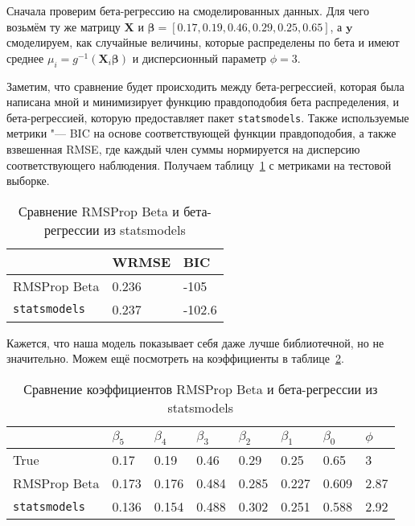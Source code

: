 \documentclass[12pt]{article}
\begin{document}
 	Сначала проверим бета-регрессию на смоделированных данных. Для чего возьмём ту же матрицу $\mathbf{X}$ и $\boldsymbol{\beta} = [0.17, 0.19, 0.46, 0.29, 0.25, 0.65]$, а $\mathbf{y}$ смоделируем, как случайные величины, которые распределены по бета и имеют среднее $\mu _i = g ^{-1} (\mathbf{X}_ i \boldsymbol{\beta})$ и дисперсионный параметр $\phi = 3$.
 	
 	Заметим, что сравнение будет происходить между бета-регрессией, которая была написана мной и минимизирует функцию правдоподобия бета распределения, и бета-регрессией, которую предоставляет пакет \verb|statsmodels|. Также используемые метрики "--- BIC на основе соответствующей функции правдоподобия, а также взвешенная RMSE, где каждый член суммы нормируется на дисперсию соответствующего наблюдения. Получаем таблицу~\ref{table2} с метриками на тестовой выборке.
 	
 	\begin{table}[h]
 		\centering
 		\caption{Сравнение RMSProp Beta и бета-регрессии из statsmodels}
 		\begin{tabular}{|l|l|l|}
 			\hline
 			& WRMSE & BIC \\ \hline
 			RMSProp Beta & 0.236 & -105 \\ \hline
 			\verb|statsmodels| & 0.237 & -102.6 \\ \hline
 		\end{tabular}
 		\label{table2}
 	\end{table}
	
	Кажется, что наша модель показывает себя даже лучше библиотечной, но не значительно. Можем ещё посмотреть на коэффициенты в таблице~\ref{table3}.
	
	\begin{table}[h]
		\centering
		\caption{Сравнение коэффициентов RMSProp Beta и бета-регрессии из statsmodels}
		\begin{tabular}{|l|l|l|l|l|l|l|l|}
			\hline
			& $\beta _5$ & $\beta _4$ & $\beta _3$ & $\beta _2$ &$\beta _1$ &$\beta _0$ & $\phi$ \\ \hline
			True & 0.17 & 0.19 & 0.46 & 0.29 & 0.25 & 0.65 & 3 \\ \hline
			RMSProp Beta & 0.173 & 0.176 & 0.484 & 0.285 & 0.227 & 0.609 & 2.87 \\ \hline
			\verb|statsmodels| & 0.136 & 0.154 & 0.488 & 0.302 & 0.251 & 0.588 & 2.92 \\ \hline
		\end{tabular}
		\label{table3}
	\end{table}
	
\end{document}
